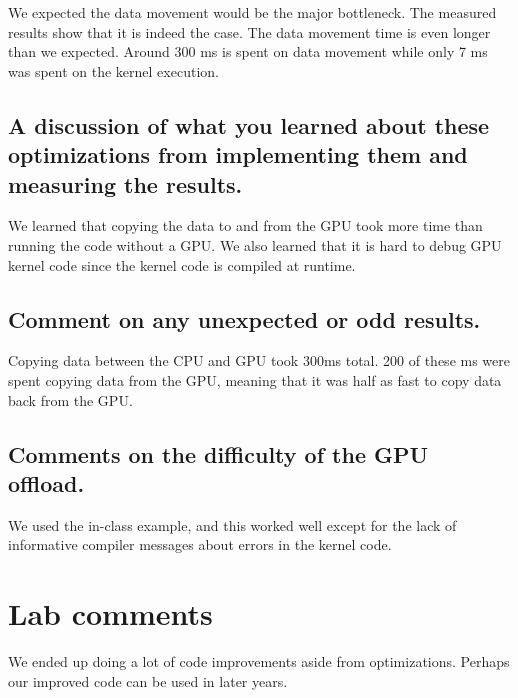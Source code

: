 \documentclass{article}
\begin{document}
We expected the data movement would be the major bottleneck. The
measured results show that it is indeed the case. The data movement
time is even longer than we expected. Around 300 ms is spent on
data movement while only 7 ms was spent on the kernel execution.

\subsection{A discussion of what you learned about these optimizations from implementing them and measuring the results.}
We learned that copying the data to and from the GPU took more time than running the code without a GPU. We also learned that it is hard to debug GPU kernel code since the kernel code is compiled at runtime.

\subsection{Comment on any unexpected or odd results.}
Copying data between the CPU and GPU took 300ms total. 200 of these ms were spent copying data from the GPU, meaning that it was half as fast to copy data back from the GPU. 


\subsection{Comments on the difficulty of the GPU offload.}
We used the in-class example, and this worked well except for the lack of informative compiler messages about errors in the kernel code.

\section{Lab comments}
We ended up doing a lot of code improvements aside from optimizations. Perhaps our improved code can be used in later years.
\end{document}
